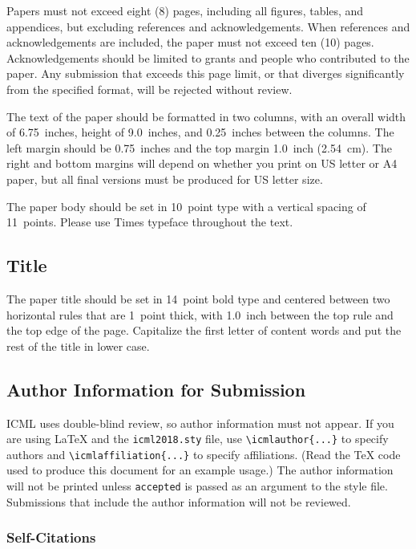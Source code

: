 \documentclass{article}
\begin{document}
Papers must not exceed eight (8) pages, including all figures, tables,
and appendices, but excluding references and acknowledgements. When references and acknowledgements are included,
the paper must not exceed ten (10) pages.
Acknowledgements should be limited to grants and people who contributed to the paper.
Any submission that exceeds
this page limit, or that diverges significantly from the specified format,
will be rejected without review.

The text of the paper should be formatted in two columns, with an
overall width of 6.75~inches, height of 9.0~inches, and 0.25~inches
between the columns. The left margin should be 0.75~inches and the top
margin 1.0~inch (2.54~cm). The right and bottom margins will depend on
whether you print on US letter or A4 paper, but all final versions
must be produced for US letter size.

The paper body should be set in 10~point type with a vertical spacing
of 11~points. Please use Times typeface throughout the text.

\subsection{Title}

The paper title should be set in 14~point bold type and centered
between two horizontal rules that are 1~point thick, with 1.0~inch
between the top rule and the top edge of the page. Capitalize the
first letter of content words and put the rest of the title in lower
case.

\subsection{Author Information for Submission}
\label{author info}

ICML uses double-blind review, so author information must not appear. If
you are using \LaTeX\/ and the \texttt{icml2018.sty} file, use
\verb+\icmlauthor{...}+ to specify authors and \verb+\icmlaffiliation{...}+ to specify affiliations. (Read the TeX code used to produce this document for an example usage.) The author information
will not be printed unless \texttt{accepted} is passed as an argument to the
style file.
Submissions that include the author information will not
be reviewed.

\subsubsection{Self-Citations}
\end{document}
